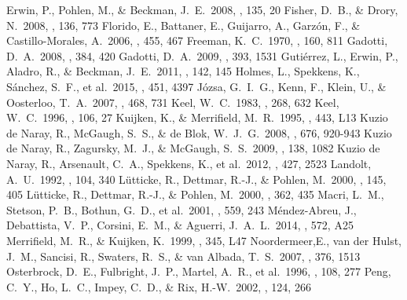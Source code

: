\documentclass[a4paper,fleqn,usenatbib]{mnras}
\begin{document}
\begin{thebibliography}{99}
 Erwin, P., Pohlen, M., \& Beckman, J.~E.\ 2008, \aj, 135, 20 
 Fisher, D.~B., \& Drory, N.\ 2008, \aj, 136, 773
 Florido, E., Battaner, E., Guijarro, A., Garz{\'o}n, F., \& Castillo-Morales, A.\ 2006, \aap, 455, 467
 Freeman, K.~C.\ 1970, \apj, 160, 811
 Gadotti, D.~A.\ 2008, \mnras, 384, 420 
 Gadotti, D.~A.\ 2009, \mnras, 393, 1531
 Guti{\'e}rrez, L., Erwin, P., Aladro, R., \& Beckman, J.~E.\ 2011, \aj, 142, 145  
 Holmes, L., Spekkens, K., S{\'a}nchez, S.~F., et al.\ 2015, \mnras, 451, 4397
 J{\'o}zsa, G.~I.~G., Kenn, F., Klein, U., \& Oosterloo, T.~A.\ 2007, \aap, 468, 731 
 Keel, W.~C.\ 1983, \apj, 268, 632
 Keel, W.~C.\ 1996, \apjs, 106, 27  
 Kuijken, K., \& Merrifield, M.~R.\ 1995, \apjl, 443, L13
 Kuzio de Naray, R., McGaugh, S.~S., \& de Blok, W.~J.~G.\ 2008, \apj, 676, 920-943
 Kuzio de Naray, R., Zagursky, M.~J., \& McGaugh, S.~S.\ 2009, \aj, 138, 1082 
 Kuzio de Naray, R., Arsenault, C.~A., Spekkens, K., et al.\ 2012, \mnras, 427, 2523 
 Landolt, A.~U.\ 1992, \aj, 104, 340 
 L{\"u}tticke, R., Dettmar, R.-J., \& Pohlen, M.\ 2000, \aaps, 145, 405 
 L{\"u}tticke, R., Dettmar, R.-J., \& Pohlen, M.\ 2000, \aap, 362, 435
 Macri, L.~M., Stetson, P.~B., Bothun, G.~D., et al.\ 2001, \apj, 559, 243 
 M{\'e}ndez-Abreu, J., Debattista, V.~P., Corsini, E.~M., \& Aguerri, J.~A.~L.\ 2014, \aap, 572, A25
 Merrifield, M.~R., \& Kuijken, K.\ 1999, \aap, 345, L47
 Noordermeer,E., van der Hulst, J.~M., Sancisi, R., Swaters, R.~S., \& van Albada, T.~S.\ 2007, \mnras, 376, 1513  
 Osterbrock, D.~E., Fulbright, J.~P., Martel, A.~R., et al.\ 1996, \pasp, 108, 277  
 Peng, C.~Y., Ho, L.~C., Impey, C.~D., \& Rix, H.-W.\ 2002, \aj, 124, 266

\end{thebibliography}
\end{document}
